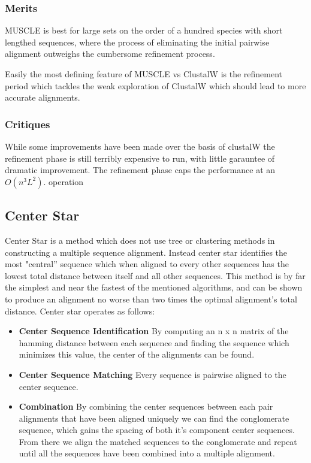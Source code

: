 \documentclass[10pt,twocolumn]{article}
\begin{document}
\subsubsection*{Merits}
MUSCLE is best for large sets on the order of a hundred species with short lengthed sequences, where the process of eliminating the initial pairwise alignment outweighs the cumbersome refinement process.

Easily the most defining feature of MUSCLE vs ClustalW is the refinement period which tackles the weak exploration of ClustalW which should lead to more accurate alignments.

\subsubsection*{Critiques}
While some improvements have been made over the basis of clustalW the refinement phase is still terribly expensive to run, with little garauntee of dramatic improvement. The refinement phase caps the performance at an $O(n^3L^2)$. operation

\subsection*{Center Star}
Center Star is a method which does not use tree or clustering methods in constructing a multiple sequence alignment. Instead center star identifies the most "central'' sequence which when aligned to every other sequences has the lowest total distance between itself and all other sequences. This method is by far the simplest and near the fastest of the mentioned algorithms, and can be shown to produce an alignment no worse than two times the optimal alignment's total distance. Center star operates as follows:
\begin{itemize}
\item \textbf{Center Sequence Identification} By computing an n x n matrix of the hamming distance between each sequence and finding the sequence which minimizes this value, the center of the alignments can be found.
\item \textbf{Center Sequence Matching} Every sequence is pairwise aligned to the center sequence.
\item \textbf{Combination} By combining the center sequences between each pair alignments that have been aligned uniquely we can find the conglomerate sequence, which gains the spacing of both it's component center sequences. From there we align the matched sequences to the conglomerate and repeat until all the sequences have been combined into a multiple alignment.
  \end{itemize}
\end{document}
